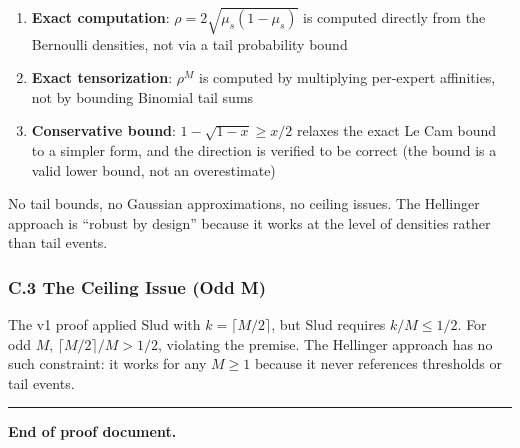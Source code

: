 \documentclass[
  12pt,
]{article}
\providecommand{\tightlist}{%
  \setlength{\itemsep}{0pt}\setlength{\parskip}{0pt}}
\begin{document}
\begin{enumerate}
\def\labelenumi{\arabic{enumi}.}
\tightlist
\item
  \textbf{Exact computation}: \(\rho = 2\sqrt{\mu_s(1-\mu_s)}\) is
  computed directly from the Bernoulli densities, not via a tail
  probability bound
\item
  \textbf{Exact tensorization}: \(\rho^M\) is computed by multiplying
  per-expert affinities, not by bounding Binomial tail sums
\item
  \textbf{Conservative bound}: \(1-\sqrt{1-x} \geq x/2\) relaxes the
  exact Le Cam bound to a simpler form, and the direction is verified to
  be correct (the bound is a valid lower bound, not an overestimate)
\end{enumerate}

No tail bounds, no Gaussian approximations, no ceiling issues. The
Hellinger approach is ``robust by design'' because it works at the level
of densities rather than tail events.

\subsubsection{C.3 The Ceiling Issue (Odd
M)}\label{c.3-the-ceiling-issue-odd-m}

The v1 proof applied Slud with \(k = \lceil M/2\rceil\), but Slud
requires \(k/M \leq 1/2\). For odd \(M\), \(\lceil M/2\rceil/M > 1/2\),
violating the premise. The Hellinger approach has no such constraint: it
works for any \(M \geq 1\) because it never references thresholds or
tail events.

\begin{center}\rule{0.5\linewidth}{0.5pt}\end{center}

\textbf{End of proof document.}
\end{document}

